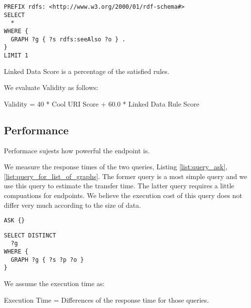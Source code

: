 \documentclass[11pt,a4paper]{article}
\begin{document}
\begin{itemize}
\begin{enumerate}
      \begin{lstlisting}[basicstyle=\ttfamily\footnotesize,breaklines=true,frame=single,caption=A Query for a See Also Statement,label=list:query_for_see_also]
PREFIX rdfs: <http://www.w3.org/2000/01/rdf-schema#>
SELECT
  *
WHERE {
  GRAPH ?g { ?s rdfs:seeAlso ?o } .
}
LIMIT 1
      \end{lstlisting}

    \end{enumerate}

    Linked Data Score is a percentage of the satisfied rules.

  \end{itemize}

  We evaluate Validity as follows:

  \begin{mdframed}
    \center
Validity = 40 * Cool URI Score + 60.0 * Linked Data Rule Score
  \end{mdframed}

\subsection{Performance}

  Performace sujests how powerful the endpoint is.

  We measure the response times of the two queries, Listing \ref{list:query_ask}, \ref{list:query_for_list_of_graphs}. The former query is a most simple query and we use this query to estimate the transfer time. The latter query requires a little compuations for endpoints. We believe the execution cost of this query does not differ very much according to the size of data.

  \begin{lstlisting}[basicstyle=\ttfamily\footnotesize,breaklines=true,frame=single,caption=A Most Simple Query,label=list:query_ask]
ASK {}
  \end{lstlisting}

  \begin{lstlisting}[basicstyle=\ttfamily\footnotesize,breaklines=true,frame=single,caption=A Query for Listing Graphs,label=list:query_for_list_of_graphs]
SELECT DISTINCT
  ?g
WHERE {
  GRAPH ?g { ?s ?p ?o }
}
  \end{lstlisting}

  We assume the execution time as:

  \begin{mdframed}
    \center
Execution Time = Differences of the response time for those queries.
  \end{mdframed}
\end{document}
